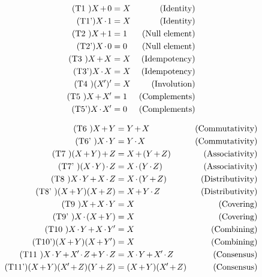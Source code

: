 \documentclass{minimal}
\newcommand{\nplus}{\mathbin{\mkern-2mu+\mkern-2mu}}
\newcommand{\ntimes}{\mathbin{\mkern-2mu\cdot\mkern-2mu}}
\renewcommand{\not}[1]{#1^{\mkern-2mu\prime}}
\begin{document}
\begin{align*}
\tag{T1 } X \nplus     0  &= X &\text{(Identity)}     \\
\tag{T1'} X \ntimes    1  &= X &\text{(Identity)}     \\
\tag{T2 } X \nplus     1  &= 1 &\text{(Null element)} \\
\tag{T2'} X \ntimes    0  &= 0 &\text{(Null element)} \\
\tag{T3 } X \nplus     X  &= X &\text{(Idempotency)}  \\
\tag{T3'} X \ntimes    X  &= X &\text{(Idempotency)}  \\
\tag{T4 } (\not{X})'      &= X &\text{(Involution)}   \\
\tag{T5 } X \nplus \not{X} &= 1 &\text{(Complements)}  \\
\tag{T5'} X \ntimes \not{X} &= 0 &\text{(Complements)}
\end{align*}

\begin{align*}
\tag{T6  } X\nplus Y              &= Y\nplus X         &\text{(Commutativity)}  \\
\tag{T6' } X\ntimes Y             &= Y\ntimes X        &\text{(Commutativity)}  \\
\tag{T7  } (X\nplus Y)\nplus Z    &= X\nplus(Y\nplus Z) &\text{(Associativity)} \\
\tag{T7' } (X\ntimes Y)\ntimes Z  &= X\ntimes(Y\ntimes Z) &\text{(Associativity)} \\
\tag{T8  } X\ntimes Y \nplus X\ntimes Z &= X\ntimes(Y\nplus Z) &\text{(Distributivity)} \\
\tag{T8' } (X\nplus Y)(X\nplus Z) &= X\nplus Y\ntimes Z &\text{(Distributivity)} \\
\tag{T9  } X\nplus X\ntimes Y     &= X           &\text{(Covering)}       \\
\tag{T9' } X\ntimes(X\nplus Y)    &= X           &\text{(Covering)}       \\
\tag{T10 } X\ntimes Y \nplus X\ntimes\not{Y} &= X  &\text{(Combining)}      \\
\tag{T10'} (X\nplus Y)(X\nplus \not{Y}) &= X &\text{(Combining)}      \\
\tag{T11 } X\ntimes Y \nplus \not{X}\ntimes Z \nplus Y\ntimes Z &= X\ntimes Y \nplus \not{X}\ntimes Z &\text{(Consensus)} \\
\tag{T11'} (X\nplus Y)(\not{X}\nplus Z)(Y\nplus Z) &= (X\nplus Y)(\not{X}\nplus Z) &\text{(Consensus)}
\end{align*}
\end{document}

